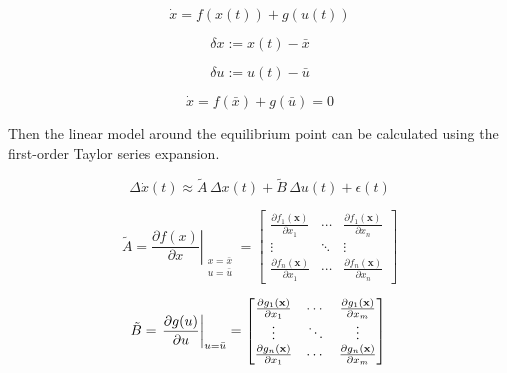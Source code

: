 \documentclass[12pt]{article}
\begin{document}
\begin{equation}
\dot{x} = f(x(t)) + g(u(t))
\end{equation}

\begin{equation}
\delta x := x(t) - \bar{x}
\end{equation}

\begin{equation}
\delta u := u(t) - \bar{u}
\end{equation}

\begin{equation}
\dot{x} = f(\bar{x}) + g(\bar{u}) = 0
\end{equation}

Then the linear model around the equilibrium point can be calculated using the first-order Taylor series expansion.

\begin{equation}
\label{eq:linearization}
\Delta\dot{x}(t) \approx  \tilde{A} \, \Delta x(t) + \tilde{B} \, \Delta u(t) + \epsilon (t)
\end{equation}

\begin{equation}
\label{eq:jacobian-f}
\tilde{A} = \left. \frac{ \partial f(x)} {\partial x} \right|_{\begin{smallmatrix} x = \bar{x} \\ u = \bar{u} \end{smallmatrix}} = \begin{bmatrix}
\frac{\partial f_1(\mathbf{x})}{\partial x_1} & \cdots & \frac{\partial f_1(\mathbf{x})}{\partial x_n} \\
\vdots & \ddots & \vdots \\
\frac{\partial f_n(\mathbf{x})}{\partial x_1} & \cdots & \frac{\partial f_n(\mathbf{x})}{\partial x_n}
\end{bmatrix}
\end{equation}

\begin{equation}
\label{eq:jacobian-g}
\tilde{B} = \left. \frac{\partial g(u)} {\partial u} \right|_{u = \bar{u}} = \begin{bmatrix}
\frac{\partial g_1(\mathbf{x})}{\partial x_1} & \cdots & \frac{\partial g_1(\mathbf{x})}{\partial x_m} \\
\vdots & \ddots & \vdots \\
\frac{\partial g_n(\mathbf{x})}{\partial x_1} & \cdots & \frac{\partial g_n(\mathbf{x})}{\partial x_m}
\end{bmatrix} \\
\end{equation}
\end{document}
